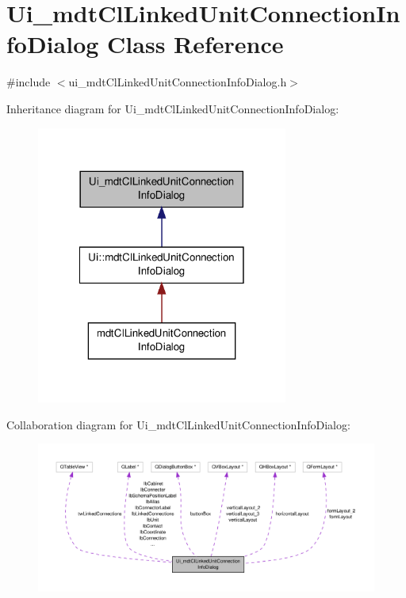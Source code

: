 \hypertarget{class_ui__mdt_cl_linked_unit_connection_info_dialog}{\section{Ui\-\_\-mdt\-Cl\-Linked\-Unit\-Connection\-Info\-Dialog Class Reference}
\label{class_ui__mdt_cl_linked_unit_connection_info_dialog}
}


{\ttfamily \#include $<$ui\-\_\-mdt\-Cl\-Linked\-Unit\-Connection\-Info\-Dialog.\-h$>$}



Inheritance diagram for Ui\-\_\-mdt\-Cl\-Linked\-Unit\-Connection\-Info\-Dialog\-:
\nopagebreak
\begin{figure}[H]
\begin{center}
\leavevmode
\includegraphics[width=234pt]{class_ui__mdt_cl_linked_unit_connection_info_dialog__inherit__graph}
\end{center}
\end{figure}


Collaboration diagram for Ui\-\_\-mdt\-Cl\-Linked\-Unit\-Connection\-Info\-Dialog\-:
\nopagebreak
\begin{figure}[H]
\begin{center}
\leavevmode
\includegraphics[width=350pt]{class_ui__mdt_cl_linked_unit_connection_info_dialog__coll__graph}
\end{center}
\end{figure}
